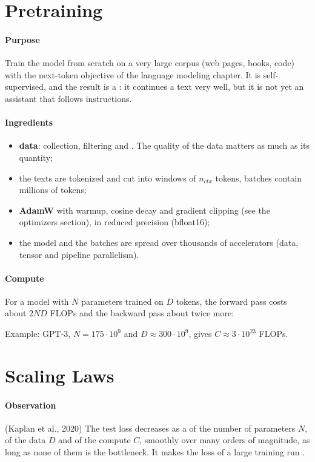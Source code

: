 \section{Pretraining}
\paragraph{Purpose}
Train the model from scratch on a very large corpus (web pages, books, code) with the
next-token objective of the language modeling chapter. It is self-supervised, and the result
is a : it continues a text very well, but it is not yet an assistant that
follows instructions.

\paragraph{Ingredients}
\begin{itemize}
    \item \textbf{data}: collection, filtering and . The quality of the
        data matters as much as its quantity;
    \item the texts are tokenized and cut into windows of $n_{ctx}$ tokens, batches contain
        millions of tokens;
    \item \textbf{AdamW} with warmup, cosine decay and gradient clipping (see the
        optimizers section), in reduced precision (bfloat16);
    \item the model and the batches are spread over thousands of accelerators
        (data, tensor and pipeline parallelism).
\end{itemize}

\paragraph{Compute}
For a model with $N$ parameters trained on $D$ tokens, the forward pass costs about $2ND$
FLOPs and the backward pass about twice more:
\begin{center}
\end{center}
Example: GPT-3, $N=175\cdot10^{9}$ and $D\approx300\cdot10^{9}$, gives
$C\approx3\cdot10^{23}$ FLOPs.

\section{Scaling Laws}
\paragraph{Observation} (Kaplan et al., 2020) The test loss decreases as a 
of the number of parameters $N$, of the data $D$ and of the compute $C$, smoothly over many
orders of magnitude, as long as none of them is the bottleneck. It makes the loss of a large
training run .

